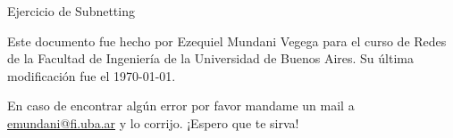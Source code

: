 \begin{center}
    \huge Ejercicio de Subnetting
\end{center}

Este documento fue hecho por Ezequiel Mundani Vegega para el curso de Redes de la Facultad de Ingeniería de la Universidad de Buenos Aires. Su última modificación fue el \today.

\skipline
En caso de encontrar algún error por favor mandame un mail a {\color{blue}\href{mailto:emundani@fi.uba.ar}{emundani@fi.uba.ar}} y lo corrijo. ¡Espero que te sirva!
